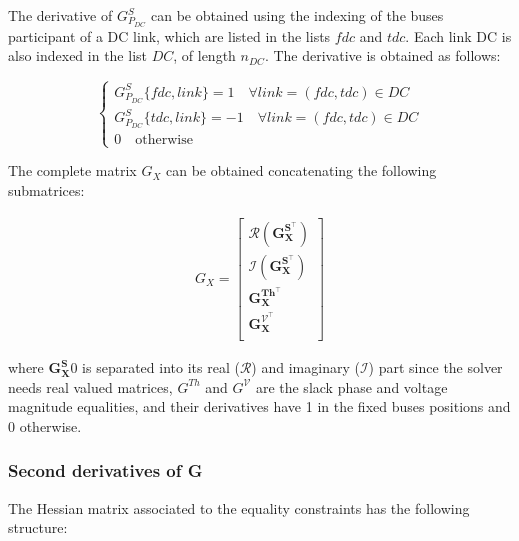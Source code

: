 The derivative of $G^S_{P_{DC}}$ can be obtained using the indexing of the buses participant of a DC link, which are listed in the lists $fdc$ and $tdc$. Each link DC is also indexed in the list $DC$, of length $n_{DC}$. The derivative is obtained as follows:

\begin{equation}
\begin{cases}
    G^S_{P_{DC}} \{fdc, link\} = 1 \quad \forall link = (fdc, tdc) \in DC\\ 
    G^S_{P_{DC}} \{tdc, link\} = -1 \quad \forall link = (fdc, tdc) \in DC\\ 
    0 \quad \text{otherwise}
\end{cases}
\end{equation} 

The complete matrix $G_X$ can be obtained concatenating the following submatrices:

\begin{equation}
\begin{split}
    G_X = \begin{bmatrix}
        \bm{\mathcal{R}(G^{S^\top}_X)} \\
        \bm{\mathcal{I}{(G^{S^\top}_X)}} \\ 
        \bm{G^{Th^\top}_X} \\
        \bm{G^{\mathcal{V}^\top}_X} \\
    \end{bmatrix}
\end{split}
\end{equation}

where $\bm{G^S_X}0$ is separated into its real ($\mathcal{R}$) and imaginary ($\mathcal{I}$) part since the solver needs real valued matrices, $G^{Th}$ and $G^{\mathcal{V}}$ are the slack phase and voltage magnitude equalities, 
and their derivatives have 1 in the fixed buses positions and 0 otherwise.

\subsubsection{Second derivatives of G}

The Hessian matrix associated to the equality constraints has the following structure:

